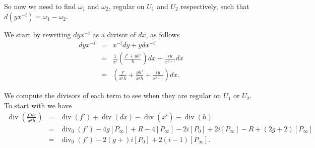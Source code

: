 \documentclass[draft, 11pt]{article} %
\theoremstyle{plain}
\theoremstyle{remark}
\DeclareMathOperator{\di}{div}
\begin{document}
So now we need to find $\omega_1$ and $\omega_2$, regular on $U_1$ and $U_2$ respectively, such that $d(yx^{-i}) = \omega_1 - \omega_2$.
\begin{comment}
We start by splitting up 
$d(yx^{-i})$ as $\frac{1}{x^i} \left(iyh + xf' + yh'x \right) dx+ \frac{iy}{x^{i+1}} dx$, and we now compute the divisors of these differentials.\todo{wrong to assume that f(0)=0?}
We let $R' = R - 2n_1[P_0] - 2(g+1-d)[P_\infty]$, $F = \di_0(h') - 2(n_1 - 1)[P_0]$ and let $E = \di_0(y) - [P_0]$.
Then
\begin{eqnarray*}
\di \left(\frac{iyh}{x^i}\right) dx  & = & (4n_1 -2i +1)[P_0] + E + 2R' + (2i-4d-3)[P_\infty] \\
\di \left(\frac{xf'}{x^i} \right) dx & = & 2(n_1 + 1 -i)[P_0] + \di_0(f') + R' -2(2+d-i)[P_\infty] \\
\di \left(\frac{yh'x}{x^i}\right) dx & = & (4n_1 + 1 -2i)[P_0] + E + F + R' - (3+4d-2i)[P_\infty] \\
\di \left( \frac{iy}{x^{i+1}}\right) dx & = & (2n_1 -2i -1)[P_0] + E + R'  -(2i+1)[P_\infty].
\end{eqnarray*}

We should note that the first and last divisor are actually just 0 if $i$ is even.

Can rewrite the last divisor as $\frac{1}{h}\left(\frac{y^2 + f}{x^{i+1}}\right)$.
Using this it seems that there should be a pole of "large" order at $P_0$.

The above is wrong, as I was using an incorrect expansion of $dy$.
\end{comment}
We start by rewriting $dyx^{-i}$ as a divisor of $dx$, as follows
\begin{eqnarray*}
dyx^{-i} & = & x^{-i}dy + ydx^{-i} \\
& = & \frac{1}{x^i} \left( \frac{f' + yh'}{h}\right) dx + \frac{iy}{x^{i+1}}dx \\
& = & \left( \frac{f'}{x^ih} + \frac{yh'}{x^ih} + \frac{iy}{x^{i+1}} \right) dx.
\end{eqnarray*}

We compute the divisors of each term to see when they are regular on $U_1$ or $U_2$.
To start with we have
\begin{eqnarray*}
\di \left( \frac{f'dx}{x^ih} \right) & = & \di (f') + \di ( dx ) - \di (x^i) - \di (h) \\
& = & \di_0 (f') - 4g[P_\infty] + R - 4[P_\infty] - 2i[P_0] + 2i[P_\infty] -R + (2g+2)[P_\infty] \\
& = & \di_0(f') - 2(g+)i[P_0] +2(i-1)[P_\infty].
\end{eqnarray*}
\end{document}
